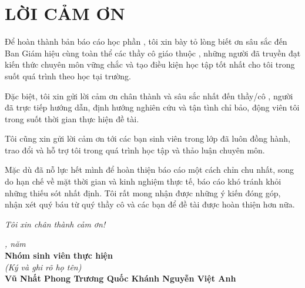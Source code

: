 
\chapter*{LỜI CẢM ƠN}

Để hoàn thành bản báo cáo học phần \textbf{\course}, tôi xin bày tỏ lòng biết ơn sâu sắc đến Ban Giám hiệu \textbf{\university} cùng toàn thể các thầy cô giáo thuộc \textbf{\faculty}, những người đã truyền đạt kiến thức chuyên môn vững chắc và tạo điều kiện học tập tốt nhất cho tôi trong suốt quá trình theo học tại trường.

Đặc biệt, tôi xin gửi lời cảm ơn chân thành và sâu sắc nhất đến thầy/cô \textbf{\supervisor}, người đã trực tiếp hướng dẫn, định hướng nghiên cứu và tận tình chỉ bảo, động viên tôi trong suốt thời gian thực hiện đề tài.

Tôi cũng xin gửi lời cảm ơn tới các bạn sinh viên trong lớp \textbf{\studentclass} đã luôn đồng hành, trao đổi và hỗ trợ tôi trong quá trình học tập và thảo luận chuyên môn.

Mặc dù đã nỗ lực hết mình để hoàn thiện báo cáo một cách chỉn chu nhất, song do hạn chế về mặt thời gian và kinh nghiệm thực tế, báo cáo khó tránh khỏi những thiếu sót nhất định. Tôi rất mong nhận được những ý kiến đóng góp, nhận xét quý báu từ quý thầy cô và các bạn để đề tài được hoàn thiện hơn nữa.

\textit{Tôi xin chân thành cảm ơn!}

\vspace{1.5cm}
\begin{flushright}
    \begin{minipage}{0.5\textwidth}
        \centering
        \textit{\location, năm \reportyear}\\[6pt]
        \textbf{Nhóm sinh viên thực hiện}\\[20pt]
        \textit{(Ký và ghi rõ họ tên)}\\[50pt]
        \textbf{Vũ Nhất Phong \quad Trương Quốc Khánh \quad Nguyễn Việt Anh}
    \end{minipage}
\end{flushright}

\clearpage
